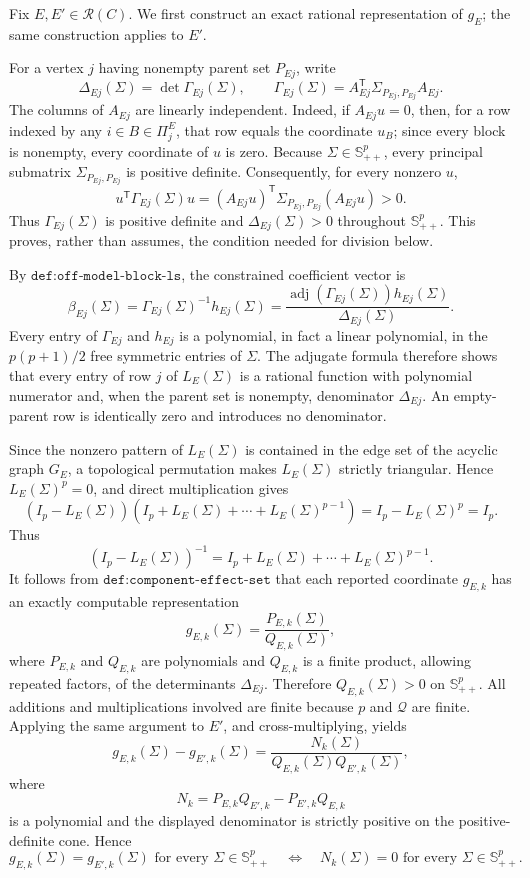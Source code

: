 Fix \(E,E'\in\mathcal R(C)\).  We first construct an exact rational representation of \(g_E\); the same construction applies to \(E'\).

For a vertex \(j\) having nonempty parent set \(P_{Ej}\), write
\[
 \Delta_{Ej}(\Sigma)=\det\Gamma_{Ej}(\Sigma),
 \qquad
 \Gamma_{Ej}(\Sigma)=A_{Ej}^{\mathsf T}
 \Sigma_{P_{Ej},P_{Ej}}A_{Ej}.
\]
The columns of \(A_{Ej}\) are linearly independent.  Indeed, if \(A_{Ej}u=0\), then, for a row indexed by any \(i\in B\in\Pi^E_j\), that row equals the coordinate \(u_B\); since every block is nonempty, every coordinate of \(u\) is zero.  Because \(\Sigma\in\mathbb S^p_{++}\), every principal submatrix \(\Sigma_{P_{Ej},P_{Ej}}\) is positive definite.  Consequently, for every nonzero \(u\),
\[
 u^{\mathsf T}\Gamma_{Ej}(\Sigma)u
 =(A_{Ej}u)^{\mathsf T}
   \Sigma_{P_{Ej},P_{Ej}}(A_{Ej}u)>0.
\]
Thus \(\Gamma_{Ej}(\Sigma)\) is positive definite and
\(\Delta_{Ej}(\Sigma)>0\) throughout \(\mathbb S^p_{++}\).  This proves, rather than assumes, the condition needed for division below.

By \(\texttt{def:off-model-block-ls}\), the constrained coefficient vector is
\[
 \beta_{Ej}(\Sigma)
 =\Gamma_{Ej}(\Sigma)^{-1}h_{Ej}(\Sigma)
 =\frac{\operatorname{adj}(\Gamma_{Ej}(\Sigma))
              h_{Ej}(\Sigma)}{\Delta_{Ej}(\Sigma)}.
\]
Every entry of \(\Gamma_{Ej}\) and \(h_{Ej}\) is a polynomial, in fact a linear polynomial, in the \(p(p+1)/2\) free symmetric entries of \(\Sigma\).  The adjugate formula therefore shows that every entry of row \(j\) of \(L_E(\Sigma)\) is a rational function with polynomial numerator and, when the parent set is nonempty, denominator \(\Delta_{Ej}\).  An empty-parent row is identically zero and introduces no denominator.

Since the nonzero pattern of \(L_E(\Sigma)\) is contained in the edge set of the acyclic graph \(G_E\), a topological permutation makes \(L_E(\Sigma)\) strictly triangular.  Hence \(L_E(\Sigma)^p=0\), and direct multiplication gives
\[
 (I_p-L_E(\Sigma))
 \left(I_p+L_E(\Sigma)+\cdots+L_E(\Sigma)^{p-1}\right)
 =I_p-L_E(\Sigma)^p=I_p.
\]
Thus
\[
 (I_p-L_E(\Sigma))^{-1}
 =I_p+L_E(\Sigma)+\cdots+L_E(\Sigma)^{p-1}.
\]
It follows from \(\texttt{def:component-effect-set}\) that each reported coordinate \(g_{E,k}\) has an exactly computable representation
\[
 g_{E,k}(\Sigma)=\frac{P_{E,k}(\Sigma)}{Q_{E,k}(\Sigma)},
\]
where \(P_{E,k}\) and \(Q_{E,k}\) are polynomials and \(Q_{E,k}\) is a finite product, allowing repeated factors, of the determinants \(\Delta_{Ej}\).  Therefore \(Q_{E,k}(\Sigma)>0\) on \(\mathbb S^p_{++}\).  All additions and multiplications involved are finite because \(p\) and \(\mathcal Q\) are finite.  Applying the same argument to \(E'\), and cross-multiplying, yields
\[
 g_{E,k}(\Sigma)-g_{E',k}(\Sigma)
 =\frac{N_k(\Sigma)}{Q_{E,k}(\Sigma)Q_{E',k}(\Sigma)},
\]
where
\[
 N_k=P_{E,k}Q_{E',k}-P_{E',k}Q_{E,k}
\]
is a polynomial and the displayed denominator is strictly positive on the positive-definite cone.  Hence
\[
 g_{E,k}(\Sigma)=g_{E',k}(\Sigma)
 \text{ for every }\Sigma\in\mathbb S^p_{++}
 \quad\Longleftrightarrow\quad
 N_k(\Sigma)=0
 \text{ for every }\Sigma\in\mathbb S^p_{++}.
\]

